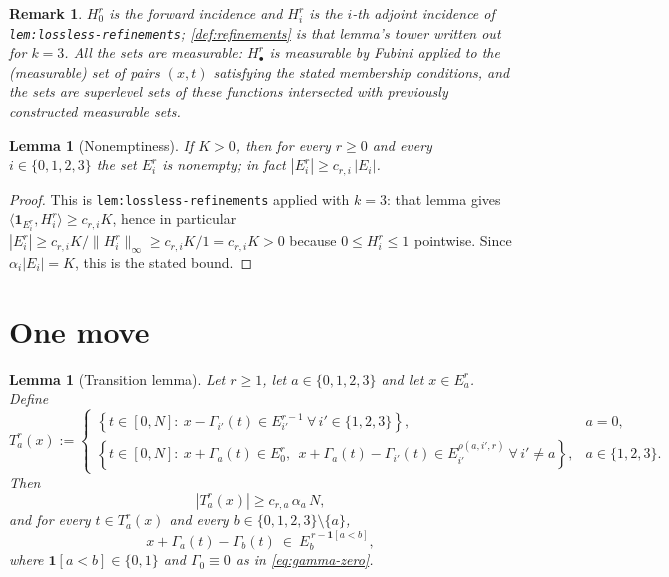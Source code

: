 \documentclass[11pt]{article}
\newtheorem{lemma}[theorem]{Lemma}
\newtheorem{remark}[theorem]{Remark}
\newcommand{\one}{\mathbf{1}}
\newcommand{\abs}[1]{\left|#1\right|}
\newcommand{\set}[1]{\left\{#1\right\}}
\newcommand{\indices}{\{1,2,3\}}
\newcommand{\Idx}{\{0,1,2,3\}}
\begin{document}
\begin{remark}
  $H_0^r$ is the forward incidence and $H_i^r$ is the $i$-th adjoint incidence of
  \texttt{lem:lossless-refinements}; \cref{def:refinements} is that lemma's
  tower written out for $k=3$.  All the sets are measurable: $H^r_\bullet$ is
  measurable by Fubini applied to the (measurable) set of pairs $(x,t)$ satisfying
  the stated membership conditions, and the sets are superlevel sets of these
  functions intersected with previously constructed measurable sets.
\end{remark}

\begin{lemma}[Nonemptiness]
  \label{lem:nonempty}
  If $K>0$, then for every $r\geq0$ and every $i\in\Idx$ the set $E_i^r$ is
  nonempty; in fact $\abs{E_i^r}\geq c_{r,i}\,\abs{E_i}$.
\end{lemma}

\begin{proof}
  This is \texttt{lem:lossless-refinements} applied with $k=3$: that lemma gives
  $\langle \one_{E_i^r},H_i^r\rangle\geq c_{r,i}K$, hence in particular
  $\abs{E_i^r}\geq c_{r,i}K/\|H^r_i\|_\infty\geq c_{r,i}K/1= c_{r,i}K>0$ because
  $0\leq H^r_i\leq1$ pointwise.  Since $\alpha_i\abs{E_i}=K$, this is the stated
  bound.
\end{proof}

\section{One move}
\label{sec:move}

\begin{lemma}[Transition lemma]
  \label{lem:transition}
  Let $r\geq1$, let $a\in\Idx$ and let $x\in E_a^r$.  Define
  \[
    T_a^r(x):=
    \begin{cases}
      \set{t\in[0,N]:\ x-\Gamma_{i'}(t)\in E_{i'}^{r-1}\ \forall\, i'\in\indices}, & a=0,\\[2pt]
      \set{t\in[0,N]:\ x+\Gamma_a(t)\in E_0^r,\ \ x+\Gamma_a(t)-\Gamma_{i'}(t)\in E_{i'}^{\rho(a,i',r)}\ \forall\, i'\neq a}, & a\in\indices.
    \end{cases}
  \]
  Then
  \begin{equation}
    \label{eq:fibre-lower}
    \abs{T_a^r(x)}\geq c_{r,a}\,\alpha_a\,N ,
  \end{equation}
  and for every $t\in T_a^r(x)$ and every $b\in\Idx\setminus\{a\}$,
  \begin{equation}
    \label{eq:move}
    x+\Gamma_a(t)-\Gamma_b(t)\ \in\ E_b^{\,r-\one[a<b]},
  \end{equation}
  where $\one[a<b]\in\{0,1\}$ and $\Gamma_0\equiv0$ as in \eqref{eq:gamma-zero}.
\end{lemma}
\end{document}
